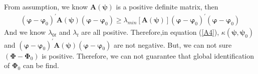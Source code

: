 \documentclass[12pt,a4paper,hyperref]{article}
\begin{document}
From assumption, we know $\boldsymbol{A}(\boldsymbol{\psi})$ is a positive definite matrix, then
\begin{align}
 \left( \boldsymbol{\varphi}-\boldsymbol{\varphi}_{0}  \right)^{'}\boldsymbol{A}(\boldsymbol{\psi})\left(  \boldsymbol{\varphi}-\boldsymbol{\varphi}_{0}\right) \geq\lambda_{min}\left[ \boldsymbol{A}(\boldsymbol{\psi})  \right]\left(\boldsymbol{\varphi}-\boldsymbol{\varphi}_{0}   \right)^{'}\left(  \boldsymbol{\varphi}-\boldsymbol{\varphi}_{0}\right)
\end{align}
And we know $\lambda_{0t}$ and $\lambda_{t}$ are all positive. Therefore,in equation (\ref{A4}), $\kappa(\boldsymbol{\psi}, \boldsymbol{\psi}_{0})$ and $\left( \boldsymbol{\varphi}-\boldsymbol{\varphi}_{0}  \right)^{'}\boldsymbol{A}(\boldsymbol{\psi})\left(  \boldsymbol{\varphi}-\boldsymbol{\varphi}_{0}\right)$ are not negative. But, we can not sure $\left(\boldsymbol{\Phi}-\boldsymbol{\Phi}_{0}  \right)$ is positive. Therefore, we can not guarantee that global identification of $\boldsymbol{\Phi}_{0}$ can be find.






\newpage

\renewcommand\refname{References}


\end{document}
